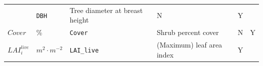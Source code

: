 \documentclass[]{book}
\begin{document}
\begin{longtable}[]{@{}llllll@{}}
\begin{minipage}[t]{0.09\columnwidth}
\end{minipage} & \begin{minipage}[t]{0.06\columnwidth}\raggedright\strut
\texttt{DBH}\strut
\end{minipage} & \begin{minipage}[t]{0.43\columnwidth}\raggedright\strut
Tree diameter at breast height\strut
\end{minipage} & \begin{minipage}[t]{0.07\columnwidth}\raggedright\strut
N\strut
\end{minipage} & \begin{minipage}[t]{0.07\columnwidth}\raggedright\strut
Y\strut
\end{minipage}\tabularnewline
\begin{minipage}[t]{0.10\columnwidth}\raggedright\strut
\(Cover\)\strut
\end{minipage} & \begin{minipage}[t]{0.09\columnwidth}\raggedright\strut
\%\strut
\end{minipage} & \begin{minipage}[t]{0.06\columnwidth}\raggedright\strut
\texttt{Cover}\strut
\end{minipage} & \begin{minipage}[t]{0.43\columnwidth}\raggedright\strut
Shrub percent cover\strut
\end{minipage} & \begin{minipage}[t]{0.07\columnwidth}\raggedright\strut
N\strut
\end{minipage} & \begin{minipage}[t]{0.07\columnwidth}\raggedright\strut
Y\strut
\end{minipage}\tabularnewline
\begin{minipage}[t]{0.10\columnwidth}\raggedright\strut
\(LAI^{live}_i\)\strut
\end{minipage} & \begin{minipage}[t]{0.09\columnwidth}\raggedright\strut
\(m^2 \cdot m^{-2}\)\strut
\end{minipage} & \begin{minipage}[t]{0.06\columnwidth}\raggedright\strut
\texttt{LAI\_live}\strut
\end{minipage} & \begin{minipage}[t]{0.43\columnwidth}\raggedright\strut
(Maximum) leaf area index\strut
\end{minipage} & \begin{minipage}[t]{0.07\columnwidth}\raggedright\strut
Y\strut
\end{minipage} & \begin{minipage}[t]{0.07\columnwidth}\raggedright\strut

\end{minipage}
\end{longtable}
\end{document}
